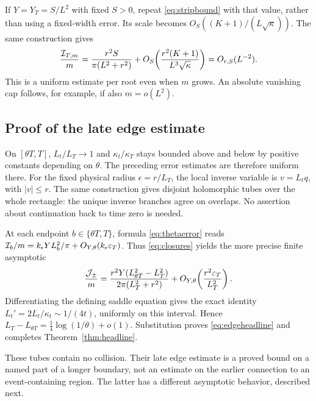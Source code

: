 If $Y=Y_T=S/L^2$ with fixed $S>0$, repeat
\eqref{eq:stripbound} with that value, rather than using a fixed-width
error. Its scale becomes $O_S((K+1)/(L\sqrt\kappa))$.
The same construction gives
\begin{equation}
 \frac{\mathcal I_{T,m}}m
 =\frac{r^2S}{\pi(L^2+r^2)}
 +O_S\!\left(\frac{r^2(K+1)}{L^3\sqrt\kappa}\right)
 =O_{r,S}(L^{-2}).
 \label{eq:shrinkingcap}
\end{equation}
This is a uniform estimate per root even when $m$ grows. An absolute
vanishing cap follows, for example, if also $m=o(L^2)$.

\subsection{Proof of the late edge estimate}

On $[\theta T,T]$, $L_t/L_T\to1$ and
$\kappa_t/\kappa_T$ stays bounded above and below by positive
constants depending on $\theta$. The preceding error estimates
are therefore uniform there. For the fixed physical radius
$\epsilon=r/L_T$, the local inverse variable is
$v=L_tq$, with $|v|\le r$. The same construction gives disjoint
holomorphic tubes over the whole rectangle: the unique inverse
branches agree on overlaps. No assertion about continuation back
to time zero is needed.

At each endpoint $b\in\{\theta T,T\}$, formula
\eqref{eq:thetaerror} reads
$\mathcal I_b/m=k_\epsilon YL_b^2/\pi+O_{Y,\theta}(k_\epsilon\varepsilon_T)$.
Thus \eqref{eq:closures} yields the more precise finite asymptotic
\begin{equation}
 \frac{\mathcal J_\pm}{m}
 =\frac{r^2Y(L_{\theta T}^2-L_T^2)}{2\pi(L_T^2+r^2)}
 +O_{Y,\theta}\!\left(\frac{r^2\varepsilon_T}{L_T^2}\right).
 \label{eq:lateedge}
\end{equation}
Differentiating the defining saddle equation gives the exact identity
$L_t'=2L_t/\kappa_t\sim1/(4t)$, uniformly on this interval.
Hence $L_T-L_{\theta T}=\frac14\log(1/\theta)+o(1)$.
Substitution proves \eqref{eq:edgeheadline} and completes
Theorem~\ref{thm:headline}.

These tubes contain no collision. Their late edge estimate is a
proved bound on a named part of a longer boundary, not an estimate
on the earlier connection to an event-containing region. The latter
has a different asymptotic behavior, described next.
